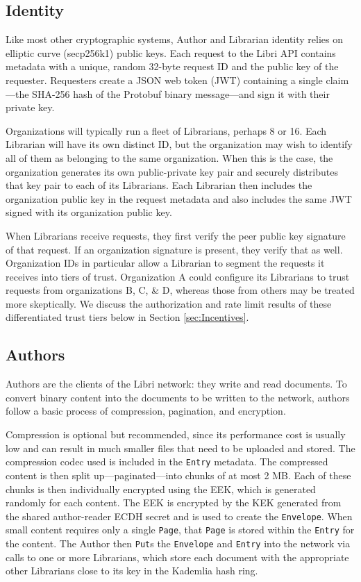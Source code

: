 \documentclass[10pt]{article}
\newcommand{\ttt}[1]{\texttt{#1}}
\def\Entry{\ttt{Entry}}
\def\Page{\ttt{Page}}
\def\Envelope{\ttt{Envelope}}
\begin{document}
\subsection{Identity}
\label{sec:Identity}
Like most other cryptographic systems, Author and Librarian identity relies on elliptic curve (secp256k1) public keys. Each request to the Libri API contains metadata with a unique, random 32-byte request ID and the public key of the requester. Requesters create a JSON web token (JWT) containing a single claim---the SHA-256 hash of the Protobuf binary message---and sign it with their private key. 

Organizations will typically run a fleet of Librarians, perhaps 8 or 16. Each Librarian will have its own distinct ID, but the organization may wish to identify all of them as belonging to the same organization. When this is the case, the organization generates its own public-private key pair and securely distributes that key pair to each of its Librarians. Each Librarian then includes the organization public key in the request metadata and also includes the same JWT signed with its organization public key.

When Librarians receive requests, they first verify the peer public key signature of that request. If an organization signature is present, they verify that as well. Organization IDs in particular allow a Librarian to segment the requests it receives into tiers of trust. Organization A could configure its Librarians to trust requests from organizations B, C, \& D, whereas those from others may be treated more skeptically. We discuss the authorization and rate limit results of these differentiated trust tiers below in Section \ref{sec:Incentives}.

\subsection{Authors}
\label{sec:Authors}
Authors are the clients of the Libri network: they write and read documents. To convert binary content into the documents to be written to the network, authors follow a basic process of compression, pagination, and encryption. 

Compression is optional but recommended, since its performance cost is usually low and can result in much smaller files that need to be uploaded and stored. The compression codec used is included in the \Entry{} metadata. The compressed content is then split up---paginated---into chunks of at most 2 MB. Each of these chunks is then individually encrypted using the EEK, which is generated randomly for each content. The EEK is encrypted by the KEK generated from the shared author-reader ECDH secret and is used to create the \Envelope{}. When small content requires only a single \Page{}, that \Page{} is stored within the \Entry{} for the content. The Author then \ttt{Put}s the \Envelope{} and \Entry{} into the network via calls to one or more Librarians, which store each document with the appropriate other Librarians close to its key in the Kademlia hash ring. 
\end{document}
